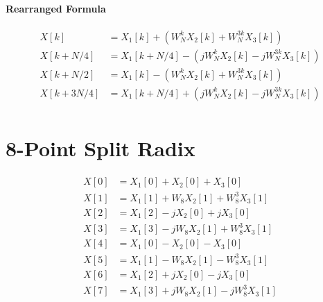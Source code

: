 \documentclass[11pt]{article}
\begin{document}
\paragraph{Rearranged Formula}

\[\begin{split}
  X[k] & = X_1[k] + \left(W_N^k X_2[k] + W_N^{3k} X_3[k]\right)\\
  X[k + N/4] & = X_1[k + N/4] - \left(jW_N^k X_2[k] - jW_N^{3k} X_3[k]\right) \\
  X[k + N/2] & = X_1[k] - \left(W_N^k X_2[k] + W_N^{3k} X_3[k]\right) \\
  X[k + 3N/4] & = X_1[k + N/4] + \left(jW_N^k X_2[k] - jW_N^{3k} X_3[k]\right) \\
\end{split}\]

\section{8-Point Split Radix}

\[\begin{split}
  X[0] & = X_1[0] + X_2[0] + X_3[0]\\
  X[1] & = X_1[1] + W_8 X_2[1] + W_8^3 X_3[1]\\
  X[2] & = X_1[2] - j X_2[0] + j X_3[0]\\
  X[3] & = X_1[3] - jW_8 X_2[1] + W_8^3 X_3[1]\\
  X[4] & = X_1[0] - X_2[0] - X_3[0]\\
  X[5] & = X_1[1] - W_8 X_2[1] - W_8^3 X_3[1]\\
  X[6] & = X_1[2] + j X_2[0] - j X_3[0]\\
  X[7] & = X_1[3] + jW_8 X_2[1] - j W_8^3 X_3[1]\\
\end{split}\]
\end{document}
